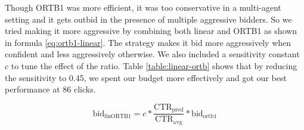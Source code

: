 \documentclass{sig-alternate-05-2015}
\begin{document}
\begin{table}[h]
  \centering
	\caption{Strategies compared}
	\label{table:strategies-compared}
\end{table}

Though ORTB1 was more efficient, it was too conservative in a multi-agent setting and it gets outbid in the presence of multiple aggressive bidders. So we tried making it more aggressive by combining both linear and ORTB1 as shown in formula \ref{eq:ortb1-linear}. The strategy makes it bid more aggressively when confident and less aggressively otherwise. We also included a sensitivity constant $c$ to tune the effect of the ratio. Table \ref{table:linear-ortb} shows that by reducing the sensitivity to 0.45, we spent our budget more effectively and got our best performance at 86 clicks. 

\begin{equation} \label{eq:ortb1-linear}
\mathrm{bid}_\mathrm{linORTB1} = c * \frac{\mathrm{CTR}_\mathrm{pred}}{\mathrm{CTR}_\mathrm{avg}} * \mathrm{bid}_\mathrm{ortb1}
\end{equation}
\end{document}
